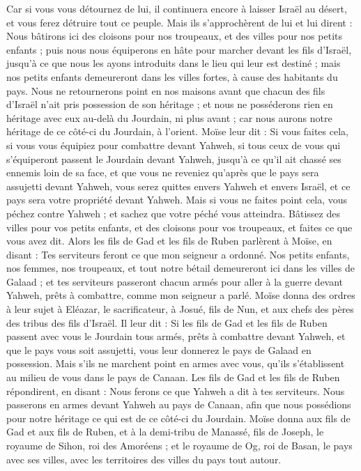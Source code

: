 \begin{multicols}{2}
Car si vous vous détournez de lui, il continuera encore à laisser Israël au désert, et vous ferez détruire tout ce peuple.
Mais ils s'approchèrent de lui et lui dirent : Nous bâtirons ici des cloisons pour nos troupeaux, et des villes pour nos petits enfants ;
puis nous nous équiperons en hâte pour marcher devant les fils d'Israël, jusqu'à ce que nous les ayons introduits dans le lieu qui leur est destiné ; mais nos petits enfants demeureront dans les villes fortes, à cause des habitants du pays.
Nous ne retournerons point en nos maisons avant que chacun des fils d'Israël n'ait pris possession de son héritage ;
et nous ne posséderons rien en héritage avec eux au-delà du Jourdain, ni plus avant ; car nous aurons notre héritage de ce côté-ci du Jourdain, à l'orient.
Moïse leur dit : Si vous faites cela, si vous vous équipiez pour combattre devant Yahweh,
si tous ceux de vous qui s’équiperont passent le Jourdain devant Yahweh, jusqu'à ce qu'il ait chassé ses ennemis loin de sa face,
et que vous ne reveniez qu'après que le pays sera assujetti devant Yahweh, vous serez quittes envers Yahweh et envers Israël, et ce pays sera votre propriété devant Yahweh.
Mais si vous ne faites point cela, vous péchez contre Yahweh ; et sachez que votre péché vous atteindra.
Bâtissez des villes pour vos petits enfants, et des cloisons pour vos troupeaux, et faites ce que vous avez dit.
Alors les fils de Gad et les fils de Ruben parlèrent à Moïse, en disant : Tes serviteurs feront ce que mon seigneur a ordonné.
Nos petits enfants, nos femmes, nos troupeaux, et tout notre bétail demeureront ici dans les villes de Galaad ;
et tes serviteurs passeront chacun armés pour aller à la guerre devant Yahweh, prêts à combattre, comme mon seigneur a parlé.
Moïse donna des ordres à leur sujet à Eléazar, le sacrificateur, à Josué, fils de Nun, et aux chefs des pères des tribus des fils d'Israël.
Il leur dit : Si les fils de Gad et les fils de Ruben passent avec vous le Jourdain tous armés, prêts à combattre devant Yahweh, et que le pays vous soit assujetti, vous leur donnerez le pays de Galaad en possession.
Mais s'ils ne marchent point en armes avec vous, qu’ils s’établissent au milieu de vous dans le pays de Canaan.
Les fils de Gad et les fils de Ruben répondirent, en disant : Nous ferons ce que Yahweh a dit à tes serviteurs.
Nous passerons en armes devant Yahweh au pays de Canaan, afin que nous possédions pour notre héritage ce qui est de ce côté-ci du Jourdain.
Moïse donna aux fils de Gad et aux fils de Ruben, et à la demi-tribu de Manassé, fils de Joseph, le royaume de Sihon, roi des Amoréens ; et le royaume de Og, roi de Basan, le pays avec ses villes, avec les territoires des villes du pays tout autour.

\end{multicols}
